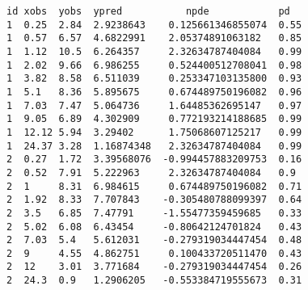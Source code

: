 {\small
\begin{verbatim}
id xobs  yobs  ypred           npde            pd
1  0.25  2.84  2.9238643    0.125661346855074  0.55
1  0.57  6.57  4.6822991    2.05374891063182   0.85
1  1.12  10.5  6.264357     2.32634787404084   0.99
1  2.02  9.66  6.986255     0.524400512708041  0.98
1  3.82  8.58  6.511039     0.253347103135800  0.93
1  5.1   8.36  5.895675     0.674489750196082  0.96
1  7.03  7.47  5.064736     1.64485362695147   0.97
1  9.05  6.89  4.302909     0.772193214188685  0.99
1  12.12 5.94  3.29402      1.75068607125217   0.99
1  24.37 3.28  1.16874348   2.32634787404084   0.99
2  0.27  1.72  3.39568076  -0.994457883209753  0.16
2  0.52  7.91  5.222963     2.32634787404084   0.9
2  1     8.31  6.984615     0.674489750196082  0.71
2  1.92  8.33  7.707843    -0.305480788099397  0.64
2  3.5   6.85  7.47791     -1.55477359459685   0.33
2  5.02  6.08  6.43454     -0.80642124701824   0.43
2  7.03  5.4   5.612031    -0.279319034447454  0.48
2  9     4.55  4.862751     0.100433720511470  0.43
2  12    3.01  3.771684    -0.279319034447454  0.26
2  24.3  0.9   1.2906205   -0.553384719555673  0.31
\end{verbatim}
}

% 

